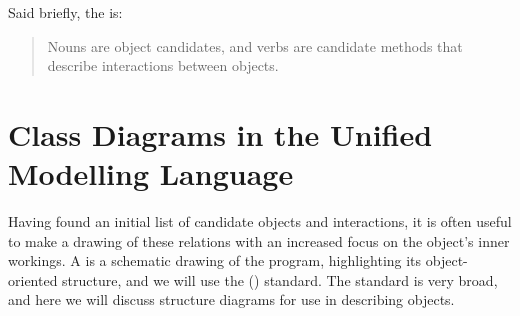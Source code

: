 \documentclass[fsharpNotes.tex]{subfiles}
\begin{document}
Said briefly, the  is:
%
\begin{quote}
  Nouns are object candidates, and verbs are candidate methods that describe interactions between objects.
\end{quote}
%

\section{Class Diagrams in the Unified Modelling Language}
Having found an initial list of candidate objects and interactions, it is often useful to make a drawing of these relations with an increased focus on the object's inner workings. A  is a schematic drawing of the program, highlighting its object-oriented structure, and we will use the  () \cite{uml2} standard. The standard is very broad, and here we will discuss structure diagrams for use in describing objects. 
\end{document}
